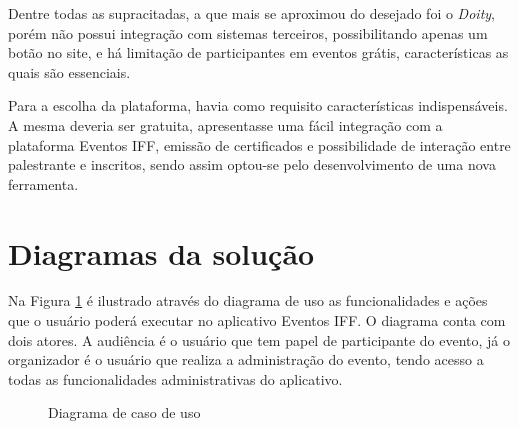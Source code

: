 Dentre todas as supracitadas, a que mais se aproximou do desejado foi o \textit{Doity}, porém não possui integração com sistemas terceiros, possibilitando apenas um botão no site, e há limitação de participantes em eventos grátis, características as quais são essenciais.

Para a escolha da plataforma, havia como requisito características indispensáveis. A mesma deveria ser gratuita, apresentasse uma fácil integração com a plataforma Eventos IFF, emissão de certificados e possibilidade de interação entre palestrante e inscritos, sendo assim optou-se pelo desenvolvimento de uma nova ferramenta.

\section{Diagramas da solução}

Na Figura \ref{fig:caso-de-uso} é ilustrado através do diagrama de uso as funcionalidades e ações que o usuário poderá executar no aplicativo Eventos IFF. O diagrama conta com dois atores. A audiência é o usuário que tem papel de participante do evento, já o organizador é o usuário que realiza a administração do evento, tendo acesso a todas as funcionalidades administrativas do aplicativo.

\begin{figure}[H]
    \centering
    \caption{Diagrama de caso de uso}
    \label{fig:caso-de-uso}
\end{figure}


